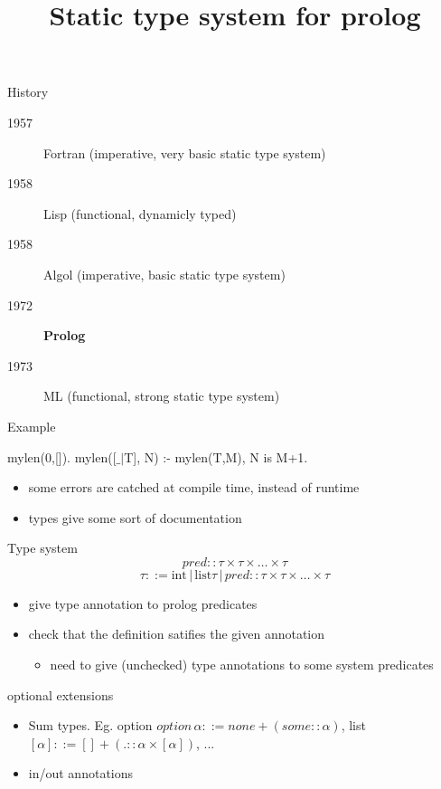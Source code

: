 \documentclass{beamer}
\title{Static type system for prolog}
\begin{document}
\begin{frame}
 \titlepage
\end{frame}

\begin{frame}{History}
 \begin{description}
   \item[1957] Fortran (imperative, very basic static type system)
   \item[1958] Lisp (functional, dynamicly typed)
   \item[1958] Algol (imperative, basic static type system)
   \item[1972] \textbf{Prolog}
   \item[1973] ML (functional, strong static type system)
\end{description}
\end{frame}
\begin{frame}{Example}

  mylen(0,[]).\newline
  mylen([$\_|$T], N) :- mylen(T,M), N is M+1.

  \begin{itemize}
   \item some errors are catched at compile time, instead of runtime
   \item types give some sort of documentation
  \end{itemize}

\end{frame}
\begin{frame}{Type system}
$$
 pred :: \tau \times \tau\times\dots\times\tau 
 $$ 
 $$
 \tau ::= \text{int} \,|\, \text{list} \tau\,|\, pred :: \tau \times \tau\times\dots\times\tau
 $$
 \begin{itemize}
  \item give type annotation to prolog predicates
  \item check that the definition satifies the given annotation
  \begin{itemize}
   \item need to give (unchecked) type annotations to some system predicates
  \end{itemize}
 \end{itemize}

 
\end{frame}
\begin{frame}{optional extensions}
 \begin{itemize}
  \item Sum types. Eg. option $option\, \alpha ::= none + (some :: \alpha)$, list $[\alpha] ::= [] + (. :: \alpha \times [\alpha])$, ...
  \item in/out annotations
 \end{itemize}

\end{frame}
\end{document}
